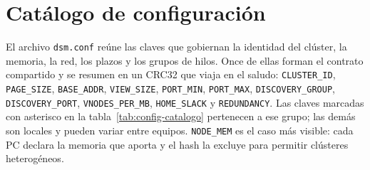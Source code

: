 \section{Catálogo de configuración}\label{app:config}

El archivo \texttt{dsm.conf} reúne las claves que gobiernan la identidad del clúster, la memoria, la red, los plazos y los grupos de hilos. Once de ellas forman el contrato compartido y se resumen en un CRC32 que viaja en el saludo: \texttt{CLUSTER\_ID}, \texttt{PAGE\_SIZE}, \texttt{BASE\_ADDR}, \texttt{VIEW\_SIZE}, \texttt{PORT\_MIN}, \texttt{PORT\_MAX}, \texttt{DISCOVERY\_GROUP}, \texttt{DISCOVERY\_PORT}, \texttt{VNODES\_PER\_MB}, \texttt{HOME\_SLACK} y \texttt{REDUNDANCY}. Las claves marcadas con asterisco en la tabla~\ref{tab:config-catalogo} pertenecen a ese grupo; las demás son locales y pueden variar entre equipos. \texttt{NODE\_MEM} es el caso más visible: cada PC declara la memoria que aporta y el hash la excluye para permitir clústeres heterogéneos.

